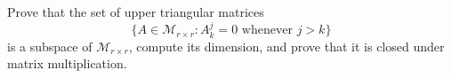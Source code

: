 \begin{exercise}
  \label{ex:hw02:upper-triangular-subspace}
  Prove that the set of upper triangular matrices
  \[
    \{A\in\mathcal M_{r\times r}:A^j_k=0\text{ whenever }j>k\}
  \]
  is a subspace of \(\mathcal M_{r\times r}\), compute its dimension,
  and prove that it is closed under matrix multiplication.
\end{exercise}
